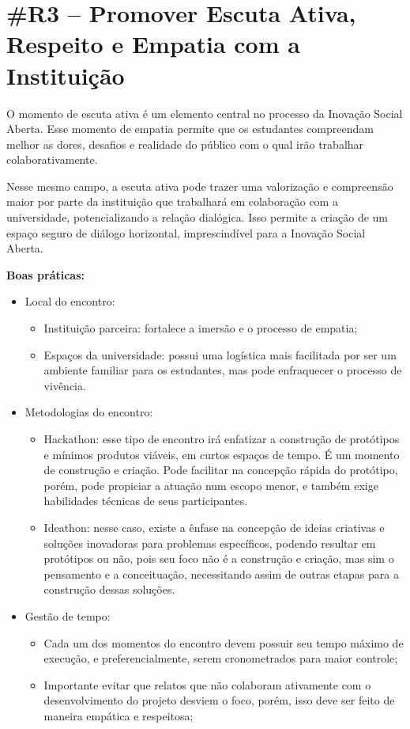\section*{\#R3 – Promover Escuta Ativa, Respeito e Empatia com a Instituição}

O momento de escuta ativa é um elemento central no processo da Inovação Social Aberta. Esse momento de empatia permite que os estudantes compreendam melhor as dores, desafios e realidade do público com o qual irão trabalhar colaborativamente.

Nesse mesmo campo, a escuta ativa pode trazer uma valorização e compreensão maior por parte da instituição que trabalhará em colaboração com a universidade, potencializando a relação dialógica. Isso permite a criação de um espaço seguro de diálogo horizontal, imprescindível para a Inovação Social Aberta.

\textbf{Boas práticas:}
\begin{itemize}
    \item Local do encontro:
    \begin{itemize}
            \item Instituição parceira: fortalece a imersão e o processo de empatia;
            \item Espaços da universidade: possui uma logística mais facilitada por ser um ambiente familiar para os estudantes, mas pode enfraquecer o processo de vivência.
    \end{itemize}

    \item Metodologias do encontro:
    \begin{itemize}
            \item Hackathon: esse tipo de encontro irá enfatizar a construção de protótipos e mínimos produtos viáveis, em curtos espaços de tempo. É um momento de construção e criação. Pode facilitar na concepção rápida do protótipo, porém, pode propiciar a atuação num escopo menor, e também exige habilidades técnicas de seus participantes.
            \item Ideathon: nesse caso, existe a ênfase na concepção de ideias criativas e soluções inovadoras para problemas específicos, podendo resultar em protótipos ou não, pois seu foco não é a construção e criação, mas sim o pensamento e a conceituação, necessitando assim de outras etapas para a construção dessas soluções.
    \end{itemize}

    \item Gestão de tempo:
    \begin{itemize}
            \item Cada um dos momentos do encontro devem possuir seu tempo máximo de execução, e preferencialmente, serem cronometrados para maior controle;
            \item Importante evitar que relatos que não colaboram ativamente com o desenvolvimento do projeto desviem o foco, porém, isso deve ser feito de maneira empática e respeitosa;
    \end{itemize}
\end{itemize}

